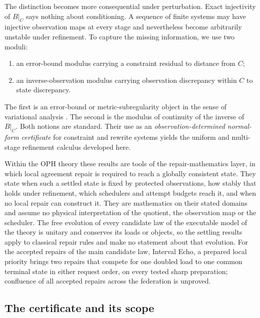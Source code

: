 \documentclass[11pt]{article}
\theoremstyle{definition}
\theoremstyle{remark}
\numberwithin{equation}{section}
\begin{document}
The distinction becomes more consequential under perturbation.  Exact injectivity of $B|_C$ says nothing about conditioning.  A sequence of finite systems may have injective observation maps at every stage and nevertheless become arbitrarily unstable under refinement.  To capture the missing information, we use two moduli:
\begin{enumerate}[label=(\roman*)]
\item an error-bound modulus carrying a constraint residual to distance from $C$;
\item an inverse-observation modulus carrying observation discrepancy within $C$ to state discrepancy.
\end{enumerate}
The first is an error-bound or metric-subregularity object in the sense of
variational analysis
\citep{Hoffman1952,Kruger2015,CibulkaDontchevKruger2018,DontchevRockafellar2014}.
The second is the modulus of continuity of the inverse of $B|_C$.  Both notions
are standard.  Their use as an \emph{observation-determined normal-form
certificate} for constraint and rewrite systems yields the uniform and
multi-stage refinement calculus developed here.

Within the OPH theory these results are tools of the repair-mathematics
layer, in which local agreement repair is required to reach a globally
consistent state. They state when such a settled state is fixed by protected
observations, how stably that holds under refinement, which schedulers and
attempt budgets reach it, and when no local repair can construct it. They
are mathematics on their stated domains and assume no physical
interpretation of the quotient, the observation map or the scheduler. The
free evolution of every candidate law of the executable model of the theory
is unitary and conserves its loads or objects, so the settling results apply
to classical repair rules and make no statement about that evolution. For the
accepted repairs of the main candidate law, Interval Echo, a prepared local
priority brings two repairs that compete for one doubled load to one common
terminal state in either request order, on every tested sharp preparation;
confluence of all accepted repairs across the federation is unproved.

\subsection{The certificate and its scope}
\end{document}

